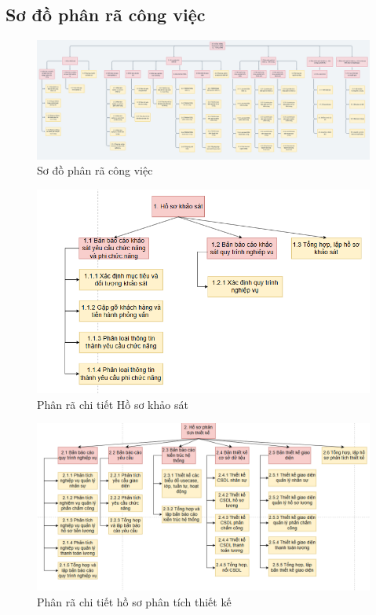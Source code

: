 \subsection{Sơ đồ phân rã công việc}
\begin{figure}[H]
    \centering
    \includegraphics[width=\textwidth]{images/sodophanratongquat.png}
    \caption{Sơ đồ phân rã công việc}
\end{figure}
\begin{figure}[H]
    \centering
    \includegraphics[width=\textwidth]{images/hskhaosat.png}
    \caption{Phân rã chi tiết Hồ sơ khảo sát}
\end{figure}
\begin{figure}[H]
    \centering
    \includegraphics[width=\textwidth]{images/hspttk.png}
    \caption{Phân rã chi tiết hồ sơ phân tích thiết kế}
\end{figure}
